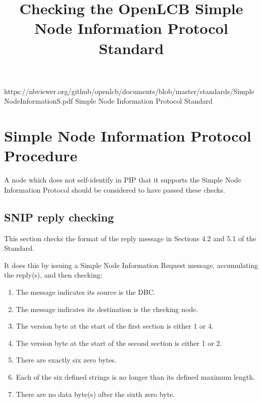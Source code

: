 

\title{Checking the OpenLCB Simple Node Information Protocol Standard}


\maketitle


\introductionCaveats
    {https://nbviewer.org/github/openlcb/documents/blob/master/standards/SimpleNodeInformationS.pdf}
    {Simple Node Information Protocol Standard}

\section{Simple Node Information Protocol Procedure}


A node which does not self-identify in PIP that it supports
the Simple Node Information Protocol should be considered to have passed these checks.
\pipsetFootnote

\subsection{SNIP reply checking}

This section checks the format of the reply message in Sections 4.2 and 5.1 of the Standard.

It does this by issuing a Simple Node Information Request message, 
accumulating the reply(s), and then checking:
    \begin{enumerate}
    \item The message indicates its source is the DBC.
    \item The message indicates its destination is the checking node.
    \item The version byte at the start of the first section is either 1 or 4.
    \item The version byte at the start of the second section is either 1 or 2.
    \item There are exactly six zero bytes.
    \item Each of the six defined strings is no longer than its defined maximum length.
    \item There are no data byte(s) after the sixth zero byte.
    \end{enumerate}

  
